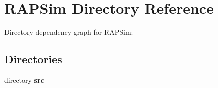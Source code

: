 \section{R\-A\-P\-Sim Directory Reference}
\label{dir_007b521299f461520acb84bd69314374}
Directory dependency graph for R\-A\-P\-Sim\-:
\subsection*{Directories}
\begin{DoxyCompactItemize}
\item 
directory {\bf src}
\end{DoxyCompactItemize}
